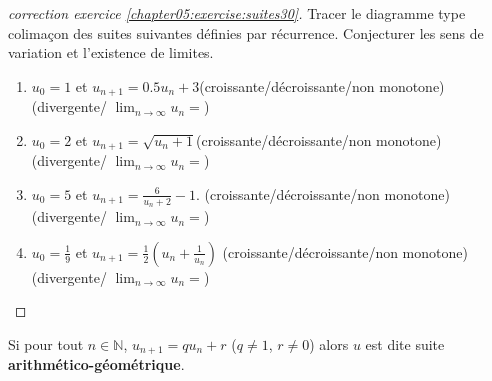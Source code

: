 \documentclass[main.tex]{subfiles}
\begin{document}
\begin{proof}[correction exercice \ref{chapter05:exercise:suites30}]  Tracer le diagramme type colimaçon des suites suivantes définies par récurrence. Conjecturer les sens de variation et l'existence de limites.
\begin{enumerate}[label=\arabic*),leftmargin=*]
	\item $u_0=1$ et $u_{n+1}=0.5u_n+3$\dotfill (croissante/décroissante/non monotone)\dotfill (divergente/ $\lim_{n\to\infty}u_n=$\dotfill) 
	\item  $u_0 = 2$ et $u_{n+1} =\sqrt{u_n+1}$\dotfill (croissante/décroissante/non monotone)\dotfill (divergente/ $\lim_{n\to\infty}u_n=$\dotfill) 
	\item $u_0=5$ et $u_{n+1}=\frac{6}{u_n+2}-1$.  \dotfill (croissante/décroissante/non monotone)\dotfill (divergente/ $\lim_{n\to\infty}u_n=$\dotfill)  
	\item  $u_0 =\frac{1}{9}$ et $u_{n+1} =\frac{1}{2}\left( u_n+\frac{1}{u_n}\right)$ \dotfill (croissante/décroissante/non monotone)\dotfill (divergente/ $\lim_{n\to\infty}u_n=$\dotfill)  
\end{enumerate} 
\end{proof}
\begin{eBox} Si pour tout $n\in\mathbb{N}$,  $u_{n+1}=qu_n+r$ ($q\neq 1$, $r\neq 0$)  alors $u$ est dite  suite \textbf{arithmético-géométrique}. 
\end{eBox}
\end{document}

